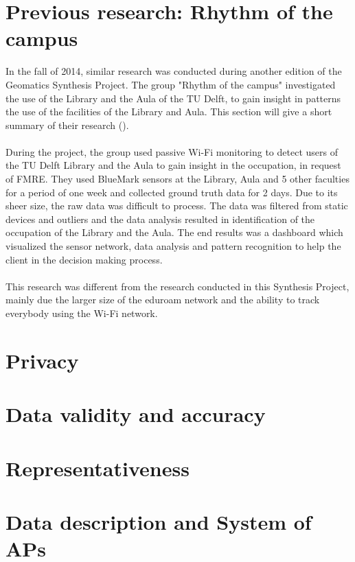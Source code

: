 \section{Previous research: Rhythm of the campus}
In the fall of 2014, similar research was conducted during another edition of the Geomatics Synthesis Project. The group "Rhythm of the campus" investigated the use of the Library and the Aula of the TU Delft, to gain insight in patterns the use of the facilities of the Library and Aula. This section will give a short summary of their research (\cite{rhythmofthecampus}).\\\\
During the project, the group used passive Wi-Fi monitoring to detect users of the TU Delft Library and the Aula to gain insight in the occupation, in request of FMRE. They used BlueMark sensors at the Library, Aula and 5 other faculties for a period of one week and collected ground truth data for 2 days. Due to its sheer size, the raw data was difficult to process. The data was filtered from static devices and outliers and the data analysis resulted in identification of the occupation of the Library and the Aula. The end results was a dashboard which visualized the sensor network, data analysis and pattern recognition to help the client in the decision making process.\\\\

This research was different from the research conducted in this Synthesis Project, mainly due the larger size of the eduroam network and the ability to track everybody using the Wi-Fi network.

\section{Privacy}

\section{Data validity and accuracy}

\section{Representativeness}

\section{Data description and System of APs}\label{datadescription}
